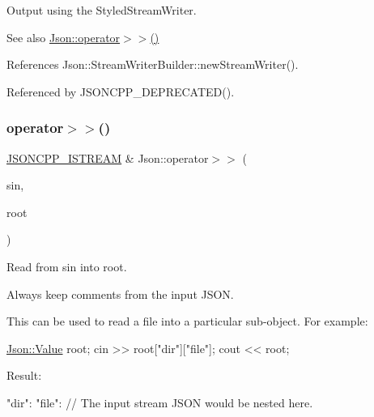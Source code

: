 Output using the Styled\+Stream\+Writer. 

\begin{DoxySeeAlso}{See also}
\hyperlink{namespaceJson_a244ed0996aba750c40c1641c06bba449_a244ed0996aba750c40c1641c06bba449}{Json\+::operator$>$$>$()} 
\end{DoxySeeAlso}


References Json\+::\+Stream\+Writer\+Builder\+::new\+Stream\+Writer().



Referenced by J\+S\+O\+N\+C\+P\+P\+\_\+\+D\+E\+P\+R\+E\+C\+A\+T\+E\+D().

\mbox{\label{namespaceJson_a244ed0996aba750c40c1641c06bba449_a244ed0996aba750c40c1641c06bba449}} 
\subsubsection{\texorpdfstring{operator$>$$>$()}{operator>>()}}
{\footnotesize\ttfamily \hyperlink{json_8h_a15f2f70b2ce0a2abd0f8112393dbc4de_a15f2f70b2ce0a2abd0f8112393dbc4de}{J\+S\+O\+N\+C\+P\+P\+\_\+\+I\+S\+T\+R\+E\+AM} \& Json\+::operator$>$$>$ (\begin{DoxyParamCaption}\item[{\hyperlink{json_8h_a15f2f70b2ce0a2abd0f8112393dbc4de_a15f2f70b2ce0a2abd0f8112393dbc4de}{J\+S\+O\+N\+C\+P\+P\+\_\+\+I\+S\+T\+R\+E\+AM} \&}]{sin,  }\item[{\hyperlink{classJson_1_1Value}{Value} \&}]{root }\end{DoxyParamCaption})}



Read from \textquotesingle{}sin\textquotesingle{} into \textquotesingle{}root\textquotesingle{}. 

Always keep comments from the input J\+S\+ON.

This can be used to read a file into a particular sub-\/object. For example\+: 
\begin{DoxyCode}
\hyperlink{classJson_1_1Value}{Json::Value} root;
cin >> root[\textcolor{stringliteral}{"dir"}][\textcolor{stringliteral}{"file"}];
cout << root;
\end{DoxyCode}
 Result\+: \begin{DoxyVerb}{
"dir": {
    "file": {
    // The input stream JSON would be nested here.
    }
}
}
\end{DoxyVerb}
 
